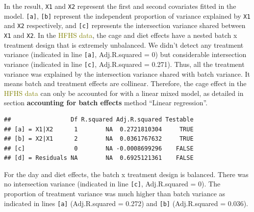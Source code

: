 \documentclass[
]{book}
\newenvironment{Shaded}{\begin{snugshade}}{\end{snugshade}}
\newcommand{\AttributeTok}[1]{\textcolor[rgb]{0.77,0.63,0.00}{#1}}
\newcommand{\FunctionTok}[1]{\textcolor[rgb]{0.00,0.00,0.00}{#1}}
\newcommand{\NormalTok}[1]{#1}
\newcommand{\OtherTok}[1]{\textcolor[rgb]{0.56,0.35,0.01}{#1}}
\newcommand{\SpecialCharTok}[1]{\textcolor[rgb]{0.00,0.00,0.00}{#1}}
\begin{document}
In the result, \texttt{X1} and \texttt{X2} represent the first and second covariates fitted in the model. \texttt{{[}a{]}}, \texttt{{[}b{]}} represent the independent proportion of variance explained by \texttt{X1} and \texttt{X2} respectively, and \texttt{{[}c{]}} represents the intersection variance shared between \texttt{X1} and \texttt{X2}. In the \textcolor{olive}{HFHS data}, the cage and diet effects have a nested batch x treatment design that is extremely unbalanced. We didn't detect any treatment variance (indicated in line \texttt{{[}a{]}}, Adj.R.squared = 0) but considerable intersection variance (indicated in line \texttt{{[}c{]}}, Adj.R.squared = 0.271). Thus, all the treatment variance was explained by the intersection variance shared with batch variance. It means batch and treatment effects are collinear. Therefore, the cage effect in the \textcolor{olive}{HFHS data} can only be accounted for with a linear mixed model, as detailed in section \textbf{accounting for batch effects} method ``Linear regression''.

\begin{Shaded}
\end{Shaded}

\begin{verbatim}
##                 Df R.squared Adj.R.squared Testable
## [a] = X1|X2      1        NA  0.2721810304     TRUE
## [b] = X2|X1      2        NA  0.0361767632     TRUE
## [c]              0        NA -0.0008699296    FALSE
## [d] = Residuals NA        NA  0.6925121361    FALSE
\end{verbatim}

For the day and diet effects, the batch x treatment design is balanced. There was no intersection variance (indicated in line \texttt{{[}c{]}}, Adj.R.squared = 0). The proportion of treatment variance was much higher than batch variance as indicated in lines \texttt{{[}a{]}} (Adj.R.squared = 0.272) and \texttt{{[}b{]}} (Adj.R.squared = 0.036).
\end{document}
